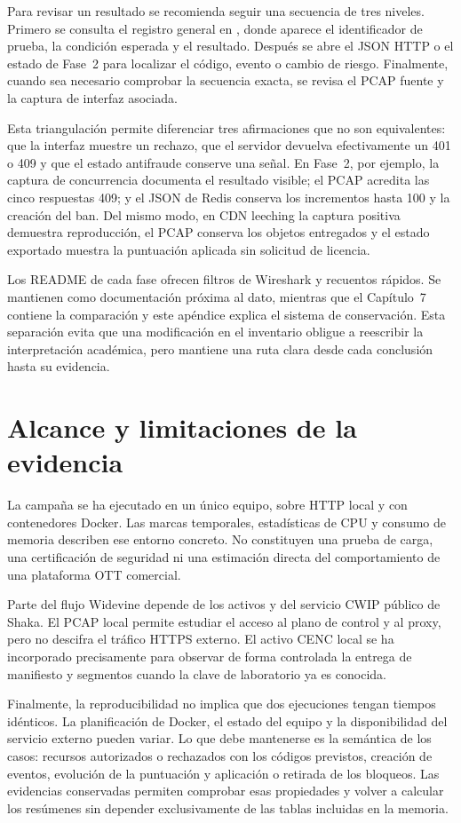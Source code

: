 Para revisar un resultado se recomienda seguir una secuencia de tres niveles. Primero se consulta el registro general en , donde aparece el identificador de prueba, la condición esperada y el resultado. Después se abre el JSON HTTP o el estado de Fase~2 para localizar el código, evento o cambio de riesgo. Finalmente, cuando sea necesario comprobar la secuencia exacta, se revisa el PCAP fuente y la captura de interfaz asociada.

Esta triangulación permite diferenciar tres afirmaciones que no son equivalentes: que la interfaz muestre un rechazo, que el servidor devuelva efectivamente un 401 o 409 y que el estado antifraude conserve una señal. En Fase~2, por ejemplo, la captura de concurrencia documenta el resultado visible; el PCAP acredita las cinco respuestas 409; y el JSON de Redis conserva los incrementos hasta 100 y la creación del ban. Del mismo modo, en CDN leeching la captura positiva demuestra reproducción, el PCAP conserva los objetos entregados y el estado exportado muestra la puntuación aplicada sin solicitud de licencia.

Los README de cada fase ofrecen filtros de Wireshark y recuentos rápidos. Se mantienen como documentación próxima al dato, mientras que el Capítulo~7 contiene la comparación y este apéndice explica el sistema de conservación. Esta separación evita que una modificación en el inventario obligue a reescribir la interpretación académica, pero mantiene una ruta clara desde cada conclusión hasta su evidencia.

\section{Alcance y limitaciones de la evidencia}

La campaña se ha ejecutado en un único equipo, sobre HTTP local y con contenedores Docker. Las marcas temporales, estadísticas de CPU y consumo de memoria describen ese entorno concreto. No constituyen una prueba de carga, una certificación de seguridad ni una estimación directa del comportamiento de una plataforma OTT comercial.

Parte del flujo Widevine depende de los activos y del servicio CWIP público de Shaka. El PCAP local permite estudiar el acceso al plano de control y al proxy, pero no descifra el tráfico HTTPS externo. El activo CENC local se ha incorporado precisamente para observar de forma controlada la entrega de manifiesto y segmentos cuando la clave de laboratorio ya es conocida.

Finalmente, la reproducibilidad no implica que dos ejecuciones tengan tiempos idénticos. La planificación de Docker, el estado del equipo y la disponibilidad del servicio externo pueden variar. Lo que debe mantenerse es la semántica de los casos: recursos autorizados o rechazados con los códigos previstos, creación de eventos, evolución de la puntuación y aplicación o retirada de los bloqueos. Las evidencias conservadas permiten comprobar esas propiedades y volver a calcular los resúmenes sin depender exclusivamente de las tablas incluidas en la memoria.